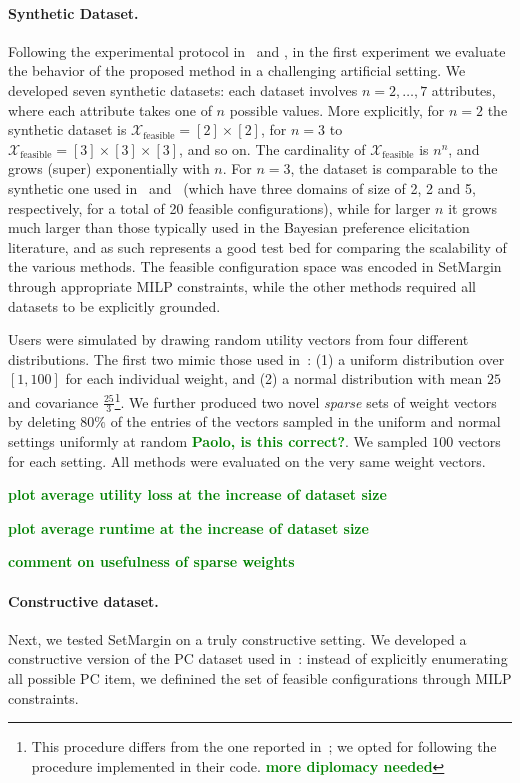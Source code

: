 \documentclass{article}
\renewcommand\[{\begin{equation}}
\renewcommand\]{\end{equation}}
\newcommand{\calvar}[1]{\ensuremath{\mathcal{#1}}}
\newcommand{\calX}{\calvar{X}}
\newcommand{\stefano}[1]{{\bf \textcolor{green}{{\fbox{Stefano:} #1}}}}
\begin{document}
\paragraph{Synthetic Dataset.} Following the experimental protocol
in~\cite{guo2010real} and \cite{viappiani2010optimal}, in the first experiment
we evaluate the behavior of the proposed method in a challenging artificial
setting. We developed seven synthetic datasets: each dataset involves
$n=2,\ldots,7$ attributes, where each attribute takes one of $n$ possible
values. More explicitly, for $n=2$ the synthetic dataset is
$\calX_\text{feasible} = [2] \times [2]$, for $n=3$ to $\calX_\text{feasible} =
[3] \times [3] \times [3]$, and so on. The cardinality of
$\calX_\text{feasible}$ is $n^n$, and grows (super) exponentially with $n$. For
$n=3$, the dataset is comparable to the synthetic one used
in~\cite{guo2010real} and~\cite{viappiani2010optimal} (which have three domains
of size of 2, 2 and 5, respectively, for a total of 20 feasible
configurations), while for larger $n$ it grows much larger than those typically
used in the Bayesian preference elicitation literature, and as such represents
a good test bed for comparing the scalability of the various methods.
The feasible configuration space was encoded in {\sc SetMargin} through
appropriate MILP constraints, while the other methods required all datasets to
be explicitly grounded.

Users were simulated by drawing random utility vectors from four different
distributions. The first two mimic those used in~\cite{guo2010real}: (1) a
uniform distribution over $[1, 100]$ for each individual weight, and (2) a
normal distribution with mean $25$ and covariance $\frac{25}{3}$\footnote{This
procedure differs from the one reported in~\cite{guo2010real}; we opted for
following the procedure implemented in their code. \stefano{more diplomacy needed}}.
We further produced two novel {\em sparse} sets of weight vectors by deleting
$80\%$ of the entries of the vectors sampled in the uniform and normal settings
uniformly at random \stefano{Paolo, is this correct?}. We sampled $100$
vectors for each setting. All methods were evaluated on the very same weight
vectors.

\stefano{plot average utility loss at the increase of dataset size}

\stefano{plot average runtime at the increase of dataset size}

\stefano{comment on usefulness of sparse weights}

\paragraph{Constructive dataset.} Next, we tested {\sc SetMargin} on a truly
constructive setting. We developed a constructive version of the PC dataset
used in~\cite{guo2010real}: instead of explicitly enumerating all possible PC
item, we definined the set of feasible configurations through MILP constraints.
\end{document}
